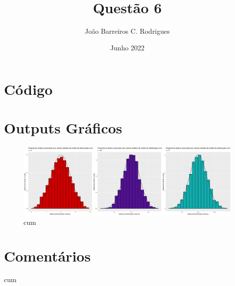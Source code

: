\documentclass[a4paper,8pt]{extarticle}
\title{ \large {\bfseries{Questão 6}}}
\author{João Barreiros C. Rodrigues}
\date{Junho 2022}
\begin{document}
	\maketitle
	\vspace{-1cm}
	\section{Código}
		
	\section{Outputs Gráficos}
		\begin{figure}[H]
                                \centering
                                \captionsetup{justification=centering}
                                \includegraphics[scale=0.25\textscale]{module6.png}
                                \caption{cum}
        	\end{figure}
	\section{Comentários}
		cum
		
\end{document}
